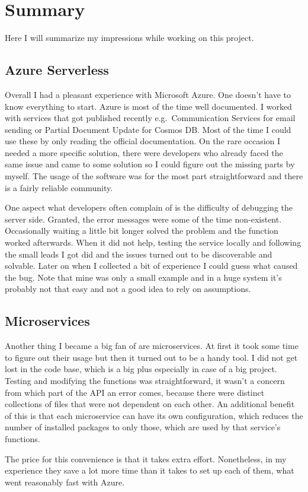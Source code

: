 \chapter{Summary}\label{Ch7}
Here I will summarize my impressions while working on this project.
\section{Azure Serverless}
Overall I had a pleasant experience with Microsoft Azure. One doesn't have to know everything to start. Azure is most of the time well documented. I worked with services that got published recently e.g.\ Communication Services for email sending or Partial Document Update for Cosmos DB. Most of the time I could use these by only reading the official documentation. On the rare occasion I needed a more specific solution, there were developers who already faced the same issue and came to some solution so I could figure out the missing parts by myself. The usage of the software was for the most part straightforward and there is a fairly reliable community.

One aspect what developers often complain of is the difficulty of debugging the server side. Granted, the error messages were some of the time non-existent. Occasionally waiting a little bit longer solved the problem and the function worked afterwards. When it did not help, testing the service locally and following the small leads I got did and the issues turned out to be discoverable and solvable. Later on when I collected a bit of experience I could guess what caused the bug. Note that mine was only a small example and in a huge system it's probably not that easy and not a good idea to rely on assumptions.
\section{Microservices}
Another thing I became a big fan of are microservices. At first it took some time to figure out their usage but then it turned out to be a handy tool. I did not get lost in the code base, which is a big plus especially in case of a big project. Testing and modifying the functions was straightforward, it wasn't a concern from which part of the API an error comes, because there were distinct collections of files that were not dependent on each other.
An additional benefit of this is that each microservice can have its own configuration, which reduces the number of installed packages to only those, which are used by that service's functions.

The price for this convenience is that it takes extra effort. Nonetheless, in my experience they save a lot more time than it takes to set up each of them, what went reasonably fast with Azure.
